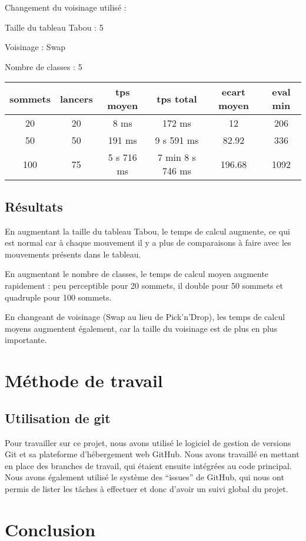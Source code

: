 \documentclass[12pt]{article}
\begin{document}
Changement du voisinage utilisé :

Taille du tableau Tabou : 5

Voisinage : Swap

Nombre de classes : 5
\bigskip

\begin{tabular}{|c|c|c|c|c|c|}
	\hline 
	sommets & lancers & tps moyen & tps total & ecart moyen & eval min\\
	\hline
	20 & 20 & 8 ms & 172  ms & 12 & 206 \\
	\hline
	 50  &  50  &   191 ms   &  9  s 591   ms   &  82.92   &   336  \\
	\hline
	 100  &  75  & 5 s 716   ms  & 7 min 8 s 746   ms   &  196.68   &   1092 \\
	\hline

\end{tabular}

\subsection{Résultats}

En augmentant la taille du tableau Tabou, le temps de calcul augmente, ce qui est normal car à chaque mouvement il y a plus de comparaisons à faire avec les mouvements présents dans le tableau.
\bigskip

En augmentant le nombre de classes, le temps de calcul moyen augmente rapidement : peu perceptible pour 20 sommets, il double pour 50 sommets et quadruple pour 100 sommets.
\bigskip 

En changeant de voisinage (Swap au lieu de Pick'n'Drop), les temps de calcul moyens augmentent également, car la taille du voisinage est de plus en plus importante.


\newpage

\section{Méthode de travail}
\subsection{Utilisation de git}
Pour travailler sur ce projet, nous avons utilisé le logiciel de gestion de versions Git et sa plateforme d’hébergement web GitHub. Nous avons travaillé en mettant en place des branches de travail, qui étaient ensuite intégrées au code principal. Nous avons également utilisé le système des “issues” de GitHub, qui nous ont permis de lister les tâches à effectuer et donc d’avoir un suivi global du projet.

\section{Conclusion}
		
\end{document}
